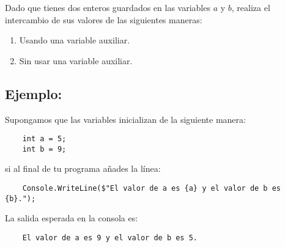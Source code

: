 Dado que tienes dos enteros guardados en las variables \(a\) y \(b\), realiza el intercambio de sus valores de las siguientes maneras:

\begin{enumerate}
    \item Usando una variable auxiliar.
    \item Sin usar una variable auxiliar.
\end{enumerate}

\subsection*{Ejemplo:} 
Supongamos que las variables inicializan de la siguiente manera:
\begin{lstlisting}
    int a = 5;
    int b = 9;
\end{lstlisting}

si al final de tu programa  añades la línea:
\begin{lstlisting}
    Console.WriteLine($"El valor de a es {a} y el valor de b es {b}.");
\end{lstlisting}

La salida esperada en la consola es:
\begin{verbatim}
    El valor de a es 9 y el valor de b es 5.
\end{verbatim}
